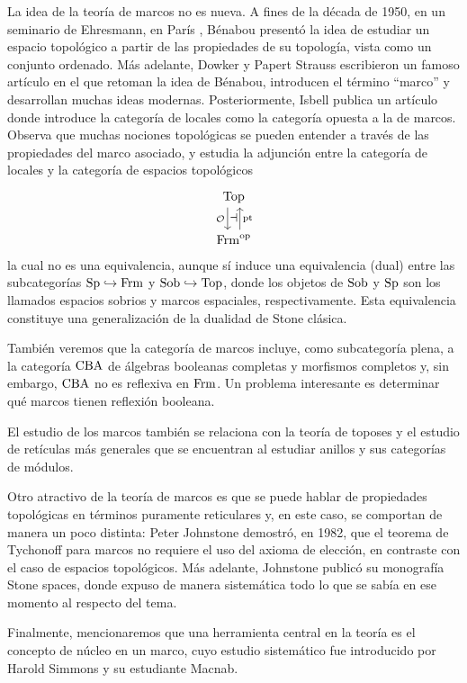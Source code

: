 La idea de la teoría de marcos no es nueva.
A fines de la década de 1950, en un seminario de Ehresmann,
en París \cite{Gattungen}, Bénabou
presentó la idea de estudiar un espacio topológico a partir
de las propiedades de su topología, vista como un conjunto ordenado.
Más adelante, Dowker y Papert Strauss escribieron un famoso artículo
\cite{Quotients}
en el que retoman la idea de Bénabou, introducen el término ``marco''
y desarrollan muchas ideas modernas.
Posteriormente, Isbell publica un artículo \cite{atomless-parts}
donde introduce
la categoría de locales como la categoría opuesta a la de marcos.
Observa que muchas nociones topológicas se pueden entender
a través de las propiedades del marco asociado,
y estudia la adjunción entre la categoría de locales y la categoría
de espacios topológicos
\[
    \begin{tikzcd}
        \Top \ar[d,"\cal O"'{name=izq},shift right=2] \\
        \Frm^\op \ar[u,"\pt"'{name=der},shift right=2]
        \adj{izq}{der}
    \end{tikzcd}
\]
la cual no es una equivalencia,
aunque sí induce una equivalencia (dual) entre las subcategorías
$\mathrm{Sp}\hookrightarrow\mathrm{Frm}$ y $\mathrm{Sob}\hookrightarrow\mathrm{Top}$,
donde los objetos de $\mathrm{Sob}$ y $\mathrm{Sp}$ son los llamados espacios sobrios
y marcos espaciales, respectivamente.
Esta equivalencia constituye una generalización de la dualidad
de Stone clásica.

También veremos que la categoría de marcos incluye,
como subcategoría plena, a la categoría $\mathrm{CBA}$ de álgebras booleanas
completas y morfismos completos y, sin embargo, $\mathrm{CBA}$ no es reflexiva
en $\mathrm{Frm}$.
Un problema interesante es determinar qué marcos tienen reflexión booleana.

El estudio de los marcos también se relaciona con la teoría de toposes
y el estudio de retículas más generales que se encuentran
al estudiar anillos y sus categorías de módulos.

Otro atractivo de la teoría de marcos es que se puede hablar
de propiedades topológicas en términos puramente reticulares y,
en este caso, se comportan de manera un poco distinta:
Peter Johnstone demostró, en 1982, que el teorema de Tychonoff
para marcos no requiere el uso del axioma de elección,
en contraste con el caso de espacios topológicos.
Más adelante, Johnstone publicó su monografía Stone spaces,
donde expuso de manera sistemática todo lo que se sabía en ese momento
al respecto del tema.

Finalmente, mencionaremos que una herramienta central
en la teoría es el concepto de núcleo en un marco,
cuyo estudio sistemático fue introducido por Harold Simmons
y su estudiante Macnab.

